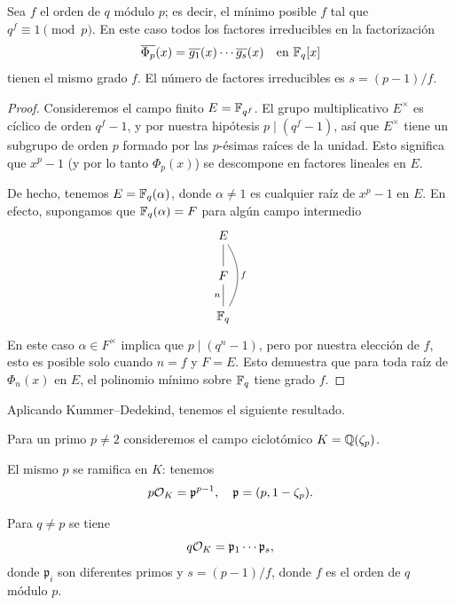 \begin{lema}
  Sea $f$ el orden de $q$ módulo $p$; es decir, el mínimo posible $f$
  tal que $q^f \equiv 1 \pmod{p}$. En este caso todos los factores irreducibles
  en la factorización
  \[ \overline{\Phi_p} (x) = \overline{g_1} (x) \cdots \overline{g_s} (x)
     \quad\text{en }\mathbb{F}_q [x] \]
  tienen el mismo grado $f$. El número de factores irreducibles es
  $s = (p-1)/f$.

  \begin{proof}
    Consideremos el campo finito $E = \mathbb{F}_{q^f}$. El grupo multiplicativo
    $E^\times$ es cíclico de orden $q^f - 1$, y por nuestra hipótesis
    $p \mid (q^f - 1)$, así que $E^\times$ tiene un subgrupo de orden $p$
    formado por las $p$-ésimas raíces de la unidad. Esto significa que $x^p - 1$
    (y por lo tanto $\Phi_p (x)$) se descompone en factores lineales en $E$.

    De hecho, tenemos $E = \mathbb{F}_q (\alpha)$, donde $\alpha \ne 1$ es cualquier
    raíz de $x^p - 1$ en $E$. En efecto, supongamos que $\mathbb{F}_q (\alpha) = F$
    para algún campo intermedio
    \[ \begin{tikzcd}
      E \ar[-]{d} \ar[-,bend left=30]{dd}{f} \\
      F \ar[-]{d}[swap]{n} \\
      \FF_q
    \end{tikzcd} \]
    En este caso $\alpha \in F^\times$ implica que $p \mid (q^n - 1)$, pero por
    nuestra elección de $f$, esto es posible solo cuando $n = f$ y $F = E$. Esto
    demuestra que para toda raíz de $\Phi_n (x)$ en $E$, el polinomio mínimo
    sobre $\mathbb{F}_q$ tiene grado $f$.
  \end{proof}
\end{lema}

Aplicando Kummer--Dedekind, tenemos el siguiente resultado.

\begin{proposicion}
  Para un primo $p \ne 2$ consideremos el campo ciclotómico $K = \mathbb{Q} (\zeta_p)$.

  El mismo $p$ se ramifica en $K$: tenemos
  $$p \mathcal{O}_K = \mathfrak{p}^{p-1}, \quad \mathfrak{p} = (p, 1 - \zeta_p).$$

  Para $q \ne p$ se tiene
  $$q \mathcal{O}_K = \mathfrak{p}_1\cdots \mathfrak{p}_s,$$
  donde $\mathfrak{p}_i$ son diferentes primos y $s = (p-1)/f$,
  donde $f$ es el orden de $q$ módulo $p$.
\end{proposicion}

